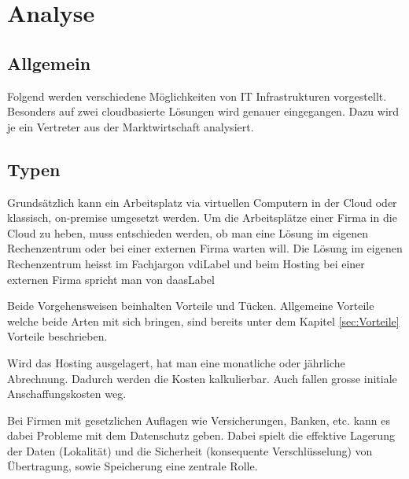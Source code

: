 

\chapter{Analyse}
\label{fig:analyse}

\section{Allgemein}

Folgend werden verschiedene Möglichkeiten von IT Infrastrukturen vorgestellt.
Besonders auf zwei cloudbasierte Lösungen wird genauer eingegangen. Dazu wird je ein Vertreter aus der Marktwirtschaft analysiert.

\section{Typen}
Grundsätzlich kann ein Arbeitsplatz via virtuellen Computern in der Cloud oder klassisch, on-premise umgesetzt werden.
Um die Arbeitsplätze einer Firma in die Cloud zu heben, muss entschieden werden, ob man eine Lösung im eigenen Rechenzentrum oder bei einer externen Firma warten will.
Die Lösung im eigenen Rechenzentrum heisst im Fachjargon \Gls{vdiLabel} und beim Hosting bei einer externen Firma spricht man von \Gls{daasLabel}

Beide Vorgehensweisen beinhalten Vorteile und Tücken. Allgemeine Vorteile welche beide Arten mit sich bringen, sind bereits unter dem Kapitel \ref{sec:Vorteile} Vorteile beschrieben.

Wird das Hosting ausgelagert, hat man eine monatliche oder jährliche Abrechnung. Dadurch werden die Kosten kalkulierbar. Auch fallen grosse initiale Anschaffungskosten weg.

Bei Firmen mit gesetzlichen Auflagen wie Versicherungen, Banken, etc. kann es dabei Probleme mit dem Datenschutz geben.
Dabei spielt die effektive Lagerung der Daten (Lokalität) und die Sicherheit (konsequente Verschlüsselung) von Übertragung, sowie Speicherung eine zentrale Rolle.

